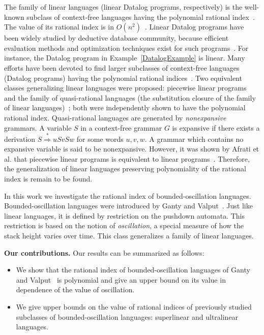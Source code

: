 \documentclass{ws-ijfcs}
\begin{document}
The family of linear languages (linear Datalog programs, respectively) is the well-known subclass of context-free languages having the polynomial rational index~\cite{RatBasic, Ullman}. The value of its rational index is in $O(n^2)$~\cite{RatBasic}. Linear Datalog programs have been widely studied by deductive database community, because efficient evaluation methods and optimization techniques exist for such programs~\cite{linearisability, linopt, Ullman}. For instance, the Datalog program in Example~\ref{DatalogExample} is linear. Many efforts have been devoted to find larger subclasses of context-free languages (Datalog programs) having the polynomial rational indices~\cite{ChainQ, linearisability, RatBasic, KanellakisParallel, Regularrealizability, Ullman, VyalyiRR}.  Two equivalent classes generalizing linear languages were proposed: piecewise linear programs~\cite{KanellakisParallel, Ullman} and the family of quasi-rational languages (the substitution closure of the family of linear languages)~\cite{RatBasic}; both were independently shown to have the polynomial rational index. Quasi-rational languages are generated by \textit{nonexpansive} grammars. A variable $S$ in a context-free grammar $G$ is expansive if there exists a derivation $S  \stackrel {*}{\Rightarrow } uSvSw$ for some words $u, v, w$. A grammar which contains no expansive variable is said to be nonexpansive. However, it was shown by Afrati et al. that piecewise linear programs is equivalent to linear programs~\cite{linearisability}. Therefore, the generalization of linear languages preserving polynomiality of the rational index is remain to be found.


In this work we investigate the rational index of  bounded-oscillation languages. Bounded-oscillation languages were introduced by Ganty and Valput~\cite{BoundOsc}. Just like linear languages, it is defined by restriction on the pushdown automata. This restriction is based on the notion of \textit{oscillation}, a special measure of how the stack height varies over time. This class generalizes a family of linear languages.


\textbf{Our contributions.} Our results can be summarized as follows:
\begin{itemize}
\item We show that the rational index of bounded-oscillation languages of Ganty and Valput~\cite{BoundOsc} is polynomial and give an upper bound on its value in dependence of the value of oscillation.
\item We give upper bounds on the value of rational indices of previously studied subclasses of bounded-oscillation languages: superlinear and ultralinear languages.
\end{itemize}


\end{document}
